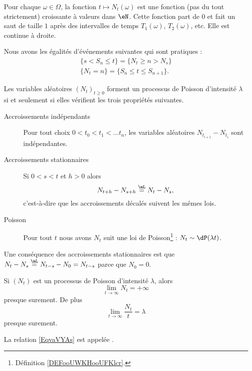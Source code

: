 Pour chaque \( \omega\in \Omega\), la fonction \( t\mapsto N_t(\omega)\) est une fonction (pas du tout strictement) croissante à valeurs dans \( \eN\). Cette fonction part de \( 0\) et fait un saut de taille \( 1\) après des intervalles de temps \( T_1(\omega)\), \( T_2(\omega)\), etc. Elle est continue à droite.

Nous avons les égalités d'événements suivantes qui sont pratiques :
\begin{subequations}
	\begin{align}
		\{ s<S_n\leq t \}=\{ N_t\geq n>N_s \} \\
		\{ N_t=n \}=\{ S_n\leq t\leq S_{n+1} \}.
	\end{align}
\end{subequations}

\begin{theorem}     \label{THOooVDMCooVycibj}
	Les variables aléatoires \( (N_t)_{t\geq 0}\) forment un processus de Poisson d'intensité \( \lambda\) si et seulement si elles vérifient les trois propriétés suivantes.
	\begin{description}
		\item[Accroissements indépendants] Pour tout choix \( 0<t_0<t_1<\ldots t_n\), les variables aléatoires \( N_{t_{i+1}}-N_{t_i}\) sont indépendantes.
		\item[Accroissements stationnaires] Si \( 0<s<t\) et \( h>0\) alors
			\begin{equation}
				N_{t+h}-N_{s+h}\stackrel{\mL}{=}N_t-N_s,
			\end{equation}
			c'est-à-dire que les accroissements décalés suivent les mêmes lois.
		\item[Poisson] Pour tout \( t\) nous avons \( N_t\) suit une loi de Poisson\footnote{Définition \ref{DEFooUWKHooUFKlcr}.} : \( N_t\sim\dP(\lambda t)\).
	\end{description}
\end{theorem}
Une conséquence des accroissements stationnaires est que \( N_t-N_s\stackrel{\mL}{=}N_{t-s}-N_0=N_{t-s}\) parce que \( N_0=0\).

\begin{proposition}
	Si \( (N_t)\) est un processus de Poisson d'intensité \( \lambda\), alors
	\begin{equation}
		\lim_{t\to \infty} N_t=+\infty
	\end{equation}
	presque surement. De plus
	\begin{equation}        \label{EqvaVYAs}
		\lim_{t\to \infty} \frac{ N_t }{ t }=\lambda
	\end{equation}
	presque surement.
\end{proposition}
La relation \eqref{EqvaVYAs} est appelée .

